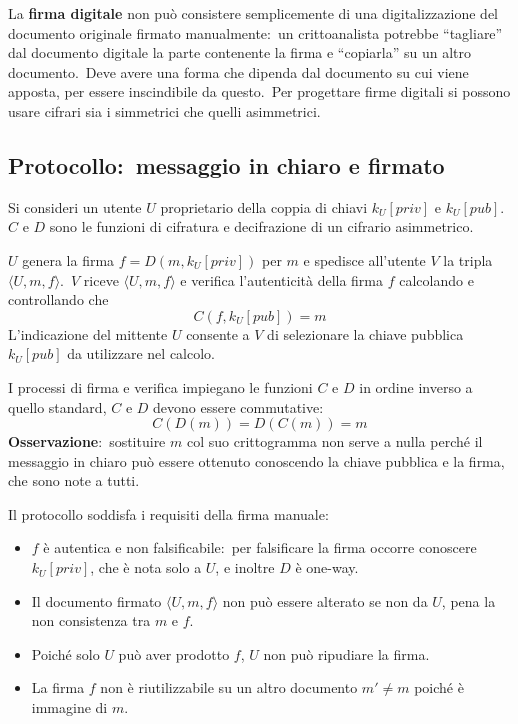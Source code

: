 \noindent La \textbf{firma digitale} non può consistere semplicemente di una digitalizzazione del documento originale firmato manualmente:\ un crittoanalista potrebbe ``tagliare'' dal documento digitale la parte contenente la firma e ``copiarla'' su un altro documento.\
Deve avere una forma che dipenda dal documento su cui viene apposta, per essere inscindibile da questo.\
Per progettare firme digitali si possono usare cifrari sia i simmetrici che quelli asimmetrici.\

\subsection{Protocollo:\ messaggio in chiaro e firmato}

Si consideri un utente $U$ proprietario della coppia di chiavi $k_U[\mathit{priv}]$ e $k_U[\mathit{pub}]$.\
$C$ e $D$ sono le funzioni di cifratura e decifrazione di un cifrario asimmetrico.\

$U$ genera la firma $f = D(m, k_U[\mathit{priv}])$ per $m$ e spedisce all'utente $V$ la tripla $\langle U,m,f \rangle$.\
$V$ riceve $\langle U,m,f \rangle$ e verifica l'autenticità della firma $f$ calcolando e controllando che
\[C(f, k_U[\mathit{pub}]) = m\]
L'indicazione del mittente $U$ consente a $V$ di selezionare la chiave pubblica $k_U[\mathit{pub}]$ da utilizzare nel calcolo.\

I processi di firma e verifica impiegano le funzioni $C$ e $D$ in ordine inverso a quello standard, $C$ e $D$ devono essere commutative:
\[C(D(m)) = D(C(m)) = m\]
\textbf{Osservazione}:\ sostituire $m$ col suo crittogramma non serve a nulla perché il messaggio in chiaro può essere ottenuto conoscendo la chiave pubblica e la firma, che sono note a tutti.\
\vspace{12pt}

\noindent Il protocollo soddisfa i requisiti della firma manuale:

\begin{itemize}
    \item $f$ è autentica e non falsificabile:\ per falsificare la firma occorre conoscere $k_U[\mathit{priv}]$, che è nota solo a $U$, e inoltre $D$ è one-way.\
    \item Il documento firmato $\langle U,m,f \rangle$ non può essere alterato se non da $U$, pena la non consistenza tra $m$ e $f$.
    \item Poiché solo $U$ può aver prodotto $f$, $U$ non può ripudiare la firma.\
    \item La firma $f$ non è riutilizzabile su un altro documento $m' \neq m$ poiché è immagine di $m$.
\end{itemize}


